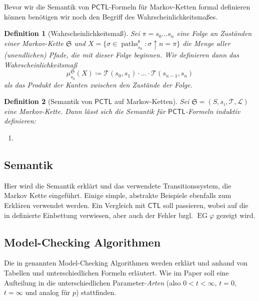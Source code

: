 \documentclass{lni}
\theoremstyle{def_style}
\newtheorem{definition}{Definition}[section]
\theoremstyle{break}
\newcommand{\paths}[2]{\operatorname{paths}^{#1}_{#2}}
\newcommand{\CTL}{\mathsf{CTL}}
\newcommand{\PCTL}{\mathsf{PCTL}}
\begin{document}
Bevor wir die Semantik von $\PCTL$-Formeln für Markov-Ketten formal definieren können benötigen wir noch den Begriff des Wahrscheinlichkeitsmaßes.

\begin{definition}[Wahrscheinlichkeitsmaß]
	 Sei $\pi = s_0\dots s_n$ eine Folge an Zuständen einer Markov-Kette $\mathfrak{S}$ und $X=\{\sigma\in \paths{\mathfrak{s}}{s_0} : \sigma\uparrow n = \pi\}$ die Menge aller (unendlichen) Pfade, die mit dieser Folge beginnen. Wir definieren dann das Wahrscheinlichkeitsmaß 
	 $$\mu^{\mathfrak{S}}_{s_0}(X)\coloneqq\mathcal{T}(s_0,s_1)\cdot \dots \cdot \mathcal{T}(s_{n-1},s_n)$$
	 als das Produkt der Kanten zwischen den Zustände der Folge.
\end{definition}


\begin{definition}[Semantik von $\PCTL$ auf Markov-Ketten]
	Sei $\mathfrak{S}=(S,s_i,\mathcal{T},\mathcal{L})$ eine Markov-Kette. Dann lässt sich die Semantik für $\PCTL$-Formeln induktiv definieren:
	\begin{enumerate}
		\item 
	\end{enumerate}
\end{definition}


\subsection{Semantik}

Hier wird die Semantik erklärt und das verwendete Transitionssystem, die Markov Kette eingeführt. 
Einige simple, abstrakte Beispiele ebenfalls zum Erklären verwendet werden.
Ein Vergleich mit $\CTL$ soll passieren, wobei auf die in \cite{hansson1994logic} definierte Einbettung verwiesen, aber auch der Fehler bzgl. $\operatorname{EG}\varphi$ gezeigt wird.

\subsection{Model-Checking Algorithmen}

Die in \cite{hansson1994logic} genannten Model-Checking Algorithmen werden erklärt und anhand von Tabellen und unterschiedlichen Formeln erläutert.
Wie im Paper soll eine Aufteilung in die unterschiedlichen Parameter-\textit{Arten} (also $0<t<\infty$, $t=0$, $t=\infty$ und analog für $p$) stattfinden.
\end{document}
